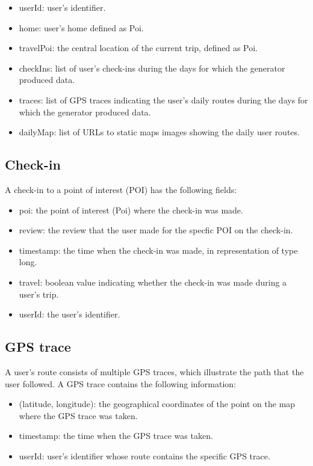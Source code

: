 \begin{itemize}
 \item userId: user's identifier.
 \item home: user's home defined as Poi.
 \item travelPoi: the central location of the current trip, defined as Poi.
 \item checkIns: list of user's check-ins during the days for which the generator produced data.
 \item traces: list of GPS traces indicating the user's daily routes during the days for which the generator produced data.
 \item dailyMap: list of URLs to static maps images showing the daily user routes.
\end{itemize}

\subsection{Check-in}

A check-in to a point of interest (POI) has the following fields:

\begin{itemize}
 \item poi: the point of interest (Poi) where the check-in was made.
 \item review: the review that the user made for the specfic POI on the check-in.
 \item timestamp: the time when the check-in was made, in representation of type long.
 \item travel: boolean value indicating whether the check-in was made during a user's trip.
 \item userId: the user's identifier.
\end{itemize}

\subsection{GPS trace}

A user's route consists of multiple GPS traces, which illustrate the path that the user followed. A GPS trace contains the following information:

\begin{itemize}
 \item (latitude, longitude): the geographical coordinates of the point on the map where the GPS trace was taken.
 \item timestamp: the time when the GPS trace was taken.
 \item userId: user's identifier whose route contains the specific GPS trace.
\end{itemize}

